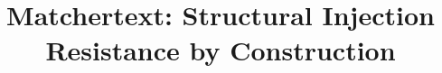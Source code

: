 \documentclass[conference,compsoc]{IEEEtran}
\begin{document}
\nocite{matchertext}

\title{Matchertext: Structural Injection Resistance by Construction}

\author{}

\maketitle

\begingroup
\renewcommand{\dataInjectionCVEs}{91{,}760\xspace}
\renewcommand{\dataContainedShare}{78\%\xspace}
\renewcommand{\dataHostableShare}{80\%\xspace}
\renewcommand{\dataSqliCases}{578{,}776\xspace}
\renewcommand{\dataSqliPayloads}{6{,}577\xspace}

\endgroup




















\appendices
{}




\end{document}
